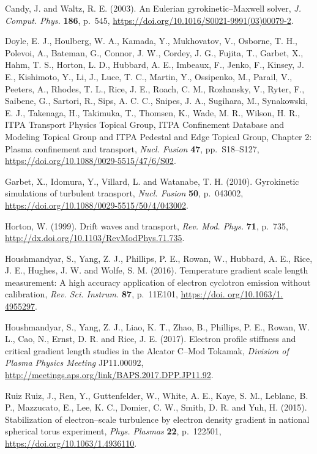 \documentclass[a4paper,openany,12pt]{report}
\begin{document}
\begin{thebibliography}{175}

\bibitem{}
Candy, J. and Waltz, R. E. (2003). An Eulerian gyrokinetic--Maxwell solver, \emph{J. Comput. Phys.} \textbf{186}, p.~545, \url{https://doi.org/10.1016/S0021-9991(03)00079-2}.

\bibitem{}
Doyle, E. J., Houlberg, W. A., Kamada, Y., Mukhovatov, V., Osborne, T. H., Polevoi, A., Bateman, G., Connor, J. W., Cordey, J. G., Fujita, T., Garbet, X., Hahm, T. S., Horton, L. D., Hubbard, A. E., Imbeaux, F., Jenko, F., Kinsey, J. E., Kishimoto, Y., Li, J., Luce, T. C., Martin, Y., Ossipenko, M., Parail, V., Peeters, A., Rhodes, T. L., Rice, J. E., Roach, C. M., Rozhansky, V., Ryter, F., Saibene, G., Sartori, R., Sips, A. C. C., Snipes, J. A., Sugihara, M., Synakowski, E. J., Takenaga, H., Takimuka, T., Thomsen, K., Wade, M. R., Wilson, H. R., ITPA Transport Physics Topical Group, ITPA Confinement Database and Modeling Topical Group and ITPA Pedestal and Edge Topical Group, Chapter 2: Plasma confinement and transport, \emph{Nucl. Fusion} \textbf{47}, pp.~S18--S127, \url{https://doi.org/10.1088/0029-5515/47/6/S02}.

\bibitem{}
Garbet, X., Idomura, Y., Villard, L. and Watanabe, T. H. (2010). Gyrokinetic simulations of turbulent transport, \emph{Nucl. Fusion} \textbf{50}, p.~043002, \url{https://doi.org/10.1088/0029-5515/50/4/043002}.

\bibitem{}
Horton, W. (1999). Drift waves and transport, \emph{Rev. Mod. Phys.} \textbf{71}, p.~735, \url{http://dx.doi.org/10.1103/RevModPhys.71.735}.

\bibitem{}
Houshmandyar, S., Yang, Z. J., Phillips, P. E., Rowan, W., Hubbard, A. E., Rice, J. E., Hughes, J. W. and Wolfe, S. M. (2016). Temperature gradient scale length measurement: A high accuracy application of electron cyclotron emission without calibration, {\it Rev. Sci. Instrum.} \textbf{87}, p.~11E101, \url{https://doi. org/10.1063/1. 4955297}.

\bibitem{}
Houshmandyar, S., Yang, Z. J., Liao, K. T., Zhao, B., Phillips, P. E., Rowan, W. L., Cao, N., Ernst, D. R. and Rice, J. E. (2017). Electron profile stiffness and critical gradient length studies in the Alcator C--Mod Tokamak, {\it Division of Plasma Physics Meeting} JP11.00092, \url{http://meetings.aps.org/link/BAPS.2017.DPP.JP11.92}.

Ruiz Ruiz, J., Ren, Y., Guttenfelder, W., White, A. E., Kaye, S. M., Leblanc, B. P., Mazzucato, E., Lee, K. C., Domier, C. W., Smith, D. R. and Yuh, H. (2015). Stabilization of electron--scale turbulence by electron density gradient in national spherical torus experiment, \emph{Phys. Plasmas} \textbf{22}, p.~122501, \url{https://doi.org/10.1063/1.4936110}.


\end{thebibliography}
\end{document}
